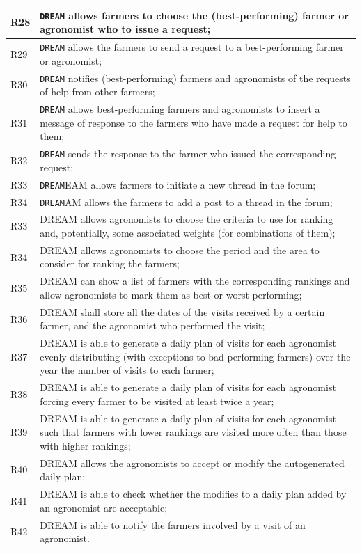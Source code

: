 \documentclass{article}
\begin{document}
\begin{longtable}[c]{|m{0.75cm}|m{11cm}|}
  \hline
R28\label{R} & \verb|DREAM| allows farmers to choose the (best-performing) farmer or agronomist who to issue a request;\\
  \hline
R29\label{R} & \verb|DREAM| allows the farmers to send a request to a best-performing farmer or agronomist;\\
  \hline
R30\label{R} & \verb|DREAM| notifies (best-performing) farmers and agronomists of the requests of help from other farmers;\\
  \hline
R31\label{R} & \verb|DREAM| allows best-performing farmers and agronomists to insert a message of response to the farmers who have made a request for help to them;\\
  \hline
R32\label{R} & \verb|DREAM| sends the response to the farmer who issued the corresponding request;\\
  \hline
R33\label{R} & \verb|DREAM|EAM allows farmers to initiate a new thread in the forum;\\
  \hline
R34\label{R} & \verb|DREAM|AM allows the farmers to add a post to a thread in the forum;\\
  \hline
R33\label{R} & DREAM allows agronomists to choose the criteria to use for ranking and, potentially, some associated weights (for combinations of them);\\
  \hline
R34\label{R} & DREAM allows agronomists to choose the period and the area to consider for ranking the farmers;\\
  \hline
R35\label{R} & DREAM can show a list of farmers with the corresponding rankings and allow agronomists to mark them as best or worst-performing;\\
  \hline
R36\label{R} & DREAM shall store all the dates of the visits received by a certain farmer, and the agronomist who performed the visit;\\
  \hline
R37\label{R} & DREAM is able to generate a daily plan of visits for each agronomist evenly distributing (with exceptions to bad-performing farmers) over the year the number of visits to each farmer;\\
  \hline
R38\label{R} & DREAM is able to generate a daily plan of visits for each agronomist forcing every farmer to be visited at least twice a year;\\
  \hline
R39\label{R} & DREAM is able to generate a daily plan of visits for each agronomist such that farmers with lower rankings are visited more often than those with higher rankings;\\
  \hline
R40\label{R} & DREAM allows the agronomists to accept or modify the autogenerated daily plan;\\
  \hline
R41\label{R} & DREAM is able to check whether the modifies to a daily plan added by an agronomist are acceptable;\\
  \hline
R42\label{R} & DREAM is able to notify the farmers involved by a visit of an agronomist.\\
  \hline
  \end{longtable}
  \newpage
\end{document}
